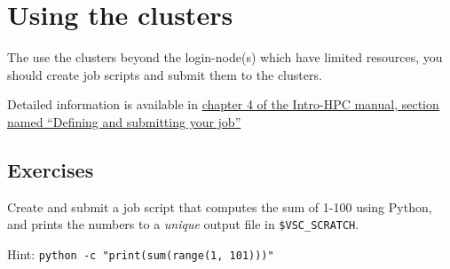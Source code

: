 \chapter{Using the clusters}

The use the clusters beyond the \gls{login-node}(s) which have limited resources, you
should create job scripts and submit them to the clusters.

Detailed information is available in
\href{\HPCManualURL#sec:defining-and-submitting-job}{chapter 4 of the Intro-HPC manual, section named ``Defining and submitting your job''}

\section{Exercises}

Create and submit a job script that computes the sum of 1-100 using Python, and
prints the numbers to a \emph{unique} output file in \lstinline|$VSC_SCRATCH|.

Hint: \lstinline|python -c "print(sum(range(1, 101)))"|

